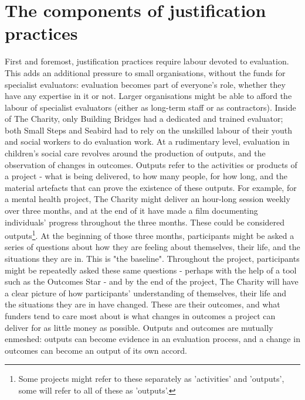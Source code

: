 \section{The components of justification practices}
\label{sec:6-3-components}
First and foremost, justification practices require labour devoted to evaluation. This adds an additional pressure to small organisations, without the funds for specialist evaluators: evaluation becomes part of everyone's role, whether they have any expertise in it or not. Larger organisations might be able to afford the labour of specialist evaluators (either as long-term staff or as contractors). Inside of The Charity, only Building Bridges had a dedicated and trained evaluator; both Small Steps and Seabird had to rely on the unskilled labour of their youth and social workers to do evaluation work. At a rudimentary level, evaluation in children's social care revolves around the production of outputs, and the observation of changes in outcomes. Outputs refer to the activities or products of a project - what is being delivered, to how many people, for how long, and the material artefacts that can prove the existence of these outputs. For example, for a mental health project,  The Charity might deliver an hour-long session weekly over three months, and at the end of it have made a film documenting individuals' progress throughout the three months. These could be considered outputs\footnote{Some projects might refer to these separately as 'activities' and 'outputs', some will refer to all of these as 'outputs'.}. At the beginning of those three months,  participants might be asked a series of questions about how they are feeling about themselves, their life, and the situations they are in. This is "the baseline". Throughout the project,  participants might be repeatedly asked these same questions - perhaps with the help of a tool such as the Outcomes Star - and by the end of the project, The Charity will have a clear picture of how participants' understanding of themselves, their life and the situations they are in have changed. These are their outcomes, and what funders tend to care most about is what changes in outcomes a project can deliver for as little money as possible. Outputs and outcomes are mutually enmeshed: outputs can become evidence in an evaluation process, and a change in outcomes can become an output of its own accord.

